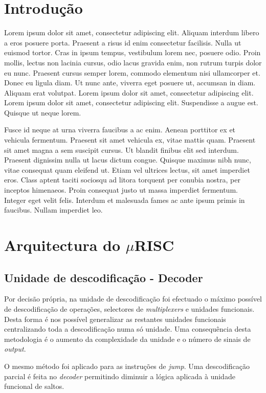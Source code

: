 \chapter{Introdução}

Lorem ipsum dolor sit amet, consectetur adipiscing elit. Aliquam interdum libero a eros posuere porta. Praesent a risus id enim consectetur facilisis. Nulla ut euismod tortor. Cras in ipsum tempus, vestibulum lorem nec, posuere odio. Proin mollis, lectus non lacinia cursus, odio lacus gravida enim, non rutrum turpis dolor eu nunc. Praesent cursus semper lorem, commodo elementum nisi ullamcorper et. Donec eu ligula diam. Ut nunc ante, viverra eget posuere ut, accumsan in diam. Aliquam erat volutpat. Lorem ipsum dolor sit amet, consectetur adipiscing elit. Lorem ipsum dolor sit amet, consectetur adipiscing elit. Suspendisse a augue est. Quisque ut neque lorem.

Fusce id neque at urna viverra faucibus a ac enim. Aenean porttitor ex et vehicula fermentum. Praesent sit amet vehicula ex, vitae mattis quam. Praesent sit amet magna a sem suscipit cursus. Ut blandit finibus elit sed interdum. Praesent dignissim nulla ut lacus dictum congue. Quisque maximus nibh nunc, vitae consequat quam eleifend ut. Etiam vel ultrices lectus, sit amet imperdiet eros. Class aptent taciti sociosqu ad litora torquent per conubia nostra, per inceptos himenaeos. Proin consequat justo ut massa imperdiet fermentum. Integer eget velit felis. Interdum et malesuada fames ac ante ipsum primis in faucibus. Nullam imperdiet leo.

\chapter{Arquitectura do $\mu$RISC}
\section{Unidade de descodificação - Decoder}

Por decisão própria, na unidade de descodificação foi efectuado o máximo possível de descodificação de operações, selectores de \textit{multiplexers} e unidades funcionais. Desta forma é nos possível generalizar as restantes unidades funcionais centralizando toda a descodificação numa só unidade. Uma consequência desta metodologia é o aumento da complexidade da unidade e o número de sinais de \textit{output}.\par O mesmo método foi aplicado para as instruções de \textit{jump}. Uma descodificação parcial é feita no \textit{decoder} permitindo diminuir a lógica aplicada à unidade funcional de saltos.


